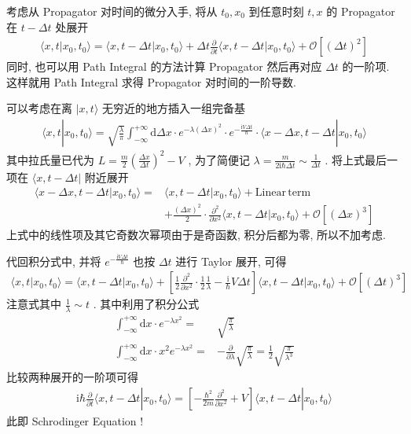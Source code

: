 \documentclass[11pt]{article}
\begin{document}
考虑从 Propagator 对时间的微分入手, 将从 \(t_0, x_0\) 到任意时刻 \(t, x\) 的
Propagator 在 \(t-\Delta t\) 处展开
\begin{align}
  \langle x, t| x_0, t_0 \rangle = \langle x, t-\Delta t | x_0 ,t_0 \rangle
  + \Delta t \frac{\partial}{\partial t}
  \langle x, t-\Delta t | x_0 ,t_0 \rangle + \mathcal{O}[(\Delta t)^2]
\end{align}
同时, 也可以用 Path Integral 的方法计算 Propagator 然后再对应 \(\Delta
t\) 的一阶项. 这样就用 Path Integral 求得 Propagator 对时间的一阶导数.

可以考虑在离 \(|x, t\rangle\) 无穷近的地方插入一组完备基
\begin{align}
  \langle x, t| x_0, t_0 \rangle = \sqrt{\frac{\lambda}{\pi}}
  \int_{-\infty}^{+\infty} \mathrm{d}\Delta x \cdot e^{-\lambda (\Delta x)^2 }
  \cdot e^{-\frac{\mathrm{i} V \Delta t}{\hbar}} \cdot
  \langle x- \Delta x, t- \Delta t| x_0, t_0 \rangle
\end{align}
其中拉氏量已代为 \(L = \frac{m}{2}\left( \frac{\Delta x}{ \Delta t}
\right)^2 - V\) , 为了简便记 \(\lambda = \frac{m}{2\mathrm{i}\hbar
\Delta t}\sim \frac{1}{\Delta t}\) . 
将上式最后一项在 \(\langle x, t- \Delta t |\) 附近展开
\begin{align*}
  \langle x- \Delta x, t- \Delta t| x_0, t_0 \rangle
  =& \langle x, t- \Delta t| x_0, t_0 \rangle + \mathrm{Linear\, term}\\
  &+ \frac{(\Delta x)^2}{2}\cdot \frac{\partial^2}{\partial x^2}
  \langle x, t- \Delta t| x_0, t_0 \rangle + \mathcal{O}[(\Delta x)^3]
\end{align*}
上式中的线性项及其它奇数次幂项由于是奇函数, 积分后都为零, 所以不加考虑.

代回积分式中, 并将 \(e^{-\frac{\mathrm{i} V\Delta t}{\hbar}}\) 也按
\(\Delta t\) 进行 Taylor 展开, 可得
\begin{align*}
  \langle x, t| x_0, t_0 \rangle =  \langle x, t-\Delta t | x_0 ,t_0 \rangle
  + \left[\frac{1}{2}\frac{\partial^2}{\partial x^2} \cdot \frac{1}{2}\frac{1}{\lambda}
   -\frac{\mathrm{i}}{\hbar}V \Delta t\right] \langle x, t- \Delta t| x_0, t_0 \rangle
  + \mathcal{O}[(\Delta t)^3]
\end{align*}
注意式其中 \(\frac{1}{\lambda}\sim t\) . 其中利用了积分公式
\begin{align}
  \int_{-\infty}^{+\infty}\mathrm{d} x\cdot e^{-\lambda x^2}
  =& \sqrt{\frac{\pi}{\lambda}} \\
  \int_{-\infty}^{+\infty}\mathrm{d} x\cdot x^2e^{-\lambda x^2}
  =& -\frac{\partial}{\partial \lambda}\sqrt{\frac{\pi}{\lambda}} 
  = \frac{1}{2}\sqrt{\frac{\pi}{\lambda^3}}
\end{align}
比较两种展开的一阶项可得
\begin{align}
  \mathrm{i}\hbar \frac{\partial}{\partial t}\langle x, t- \Delta t| x_0, t_0 \rangle
  =\left[ -\frac{\hbar^2}{2m}\frac{\partial^2}{\partial x^2}
  +V\right]\langle x, t- \Delta t| x_0, t_0 \rangle
\end{align}
此即 Schrodinger Equation !
\end{document}
